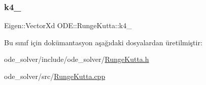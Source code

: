 \mbox{\label{classODE_1_1RungeKutta_a1dc77bd2fb304d6c1d5d77894257f174}} 
\subsubsection{\texorpdfstring{k4\_}{k4\_}}
{\footnotesize\ttfamily Eigen\+::\+Vector\+Xd O\+D\+E\+::\+Runge\+Kutta\+::k4\+\_\+\hspace{0.3cm}{\ttfamily [protected]}}



Bu sınıf için dokümantasyon aşağıdaki dosyalardan üretilmiştir\+:\begin{DoxyCompactItemize}
\item 
ode\+\_\+solver/include/ode\+\_\+solver/\mbox{\hyperlink{RungeKutta_8h}{Runge\+Kutta.\+h}}\item 
ode\+\_\+solver/src/\mbox{\hyperlink{RungeKutta_8cpp}{Runge\+Kutta.\+cpp}}\end{DoxyCompactItemize}
